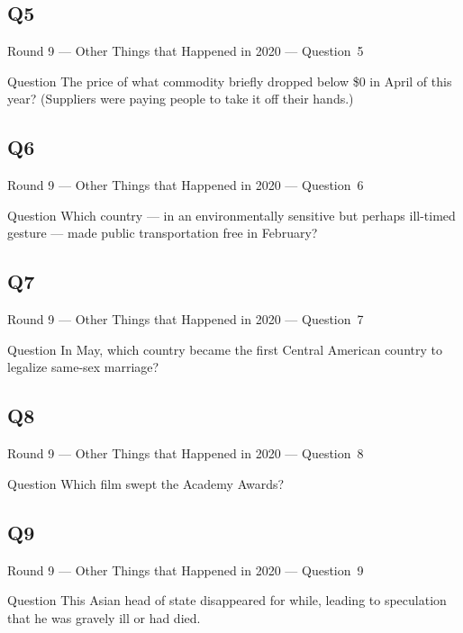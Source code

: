 \documentclass[11pt]{beamer}
\begin{document}
\subsection*{Q5}
\begin{frame}[t]{Round 9 --- Other Things that Happened in 2020 --- \mbox{Question 5}}
    \vspace{-0.5em}
    \begin{block}{Question}
        The price of what commodity briefly dropped below \$0 in April of this year? (Suppliers were paying people to take it off their hands.)
    \end{block}
\end{frame}
\subsection*{Q6}
\begin{frame}[t]{Round 9 --- Other Things that Happened in 2020 --- \mbox{Question 6}}
    \vspace{-0.5em}
    \begin{block}{Question}
        Which country --- in an environmentally sensitive but perhaps ill-timed gesture --- made public transportation free in February?
    \end{block}
\end{frame}
\subsection*{Q7}
\begin{frame}[t]{Round 9 --- Other Things that Happened in 2020 --- \mbox{Question 7}}
    \vspace{-0.5em}
    \begin{block}{Question}
        In May, which country became the first Central American country to legalize same-sex marriage?
    \end{block}
\end{frame}
\subsection*{Q8}
\begin{frame}[t]{Round 9 --- Other Things that Happened in 2020 --- \mbox{Question 8}}
    \vspace{-0.5em}
    \begin{block}{Question}
        Which film swept the Academy Awards?
    \end{block}
\end{frame}
\subsection*{Q9}
\begin{frame}[t]{Round 9 --- Other Things that Happened in 2020 --- \mbox{Question 9}}
    \vspace{-0.5em}
    \begin{block}{Question}
        This Asian head of state disappeared for while, leading to speculation that he was gravely ill or had died.
    \end{block}
\end{frame}
\end{document}
